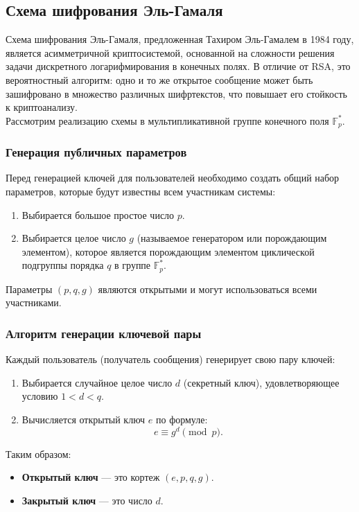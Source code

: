 \subsection{Схема шифрования Эль-Гамаля}

Схема шифрования Эль-Гамаля, предложенная Тахиром Эль-Гамалем в 1984 году, является асимметричной криптосистемой, основанной на сложности решения задачи дискретного логарифмирования в конечных полях. В отличие от RSA, это вероятностный алгоритм: одно и то же открытое сообщение может быть зашифровано в множество различных шифртекстов, что повышает его стойкость к криптоанализу.\\

\noindent Рассмотрим реализацию схемы в мультипликативной группе конечного поля $\mathbb{F}_p^*$.

\subsubsection{Генерация публичных параметров}
Перед генерацией ключей для пользователей необходимо создать общий набор параметров, которые будут известны всем участникам системы:
\begin{enumerate}
    \item Выбирается большое простое число $p$.
    \item Выбирается целое число $g$ (называемое генератором или порождающим элементом), которое является порождающим элементом циклической подгруппы порядка $q$ в группе $\mathbb{F}_p^*$.
\end{enumerate}
Параметры $(p, q, g)$ являются открытыми и могут использоваться всеми участниками.

\subsubsection{Алгоритм генерации ключевой пары}
Каждый пользователь (получатель сообщения) генерирует свою пару ключей:
\begin{enumerate}
    \item Выбирается случайное целое число $d$ (секретный ключ), удовлетворяющее условию $1 < d < q$.
    \item Вычисляется открытый ключ $e$ по формуле:
    \[ e \equiv g^d \pmod p. \]
\end{enumerate}
Таким образом:
\begin{itemize}
    \item \textbf{Открытый ключ} — это кортеж $(e, p, q, g)$.
    \item \textbf{Закрытый ключ} — это число $d$.
\end{itemize}

